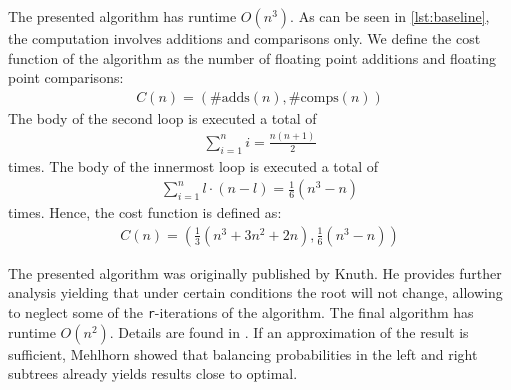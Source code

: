  The presented algorithm has runtime $O(n^3)$. As can
be seen in \autoref{lst:baseline}, the computation involves additions and
comparisons only. We define the cost function of the algorithm as the
number of floating point additions and floating point comparisons:
\begin{align*}
C(n) = (\#\text{adds}(n), \#\text{comps}(n))
\end{align*}
The body of the second loop is executed a total of
\begin{align*}
\sum_{i=1}^{n} i = \frac{n(n+1)}{2}
\end{align*}
times. The body of the innermost loop is executed a total of
\begin{align*}
\sum_{i=1}^{n} l\cdot(n-l) = \frac{1}{6}(n^3-n)
\end{align*}
times.  Hence, the cost function is defined as:
\begin{align*}
C(n) = \left(\frac{1}{3}(n^3+3n^2+2n), \frac{1}{6}(n^3 - n)\right)
\end{align*}

 The presented algorithm was originally
published by Knuth. He provides further analysis yielding that under
certain conditions the root will not change, allowing to neglect some of
the \texttt{r}-iterations of the algorithm. The final algorithm has runtime
$O(n^2)$. Details are found in \cite{Knuth70}. If an approximation of the
result is sufficient, Mehlhorn \cite{Mehlhorn75} showed that balancing
probabilities in the left and right subtrees already yields results close
to optimal.
